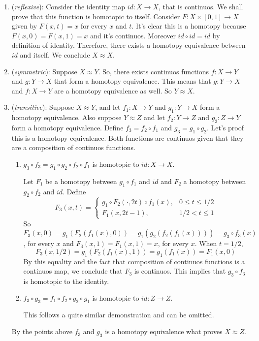 \documentclass[a4paper,11pt]{article}
\theoremstyle{mytheor}
\theoremstyle{mytheor}
\theoremstyle{remark}
\begin{document}
\begin{enumerate}
    \item (\textit{reflexive}): Consider the identity map $id: X \to X$,
    that is continuos.
    We shall prove that this function is homotopic to itself. Consider $F : X
    \times [0,1] \to X$ given by $F(x,t) = x$ for every $x$ and $t$. It's
    clear this is a homotopy because $F(x,0) = F(x,1) = x$ and it's continuos. Moreover
    $id \circ id = id$ by definition of identity. Therefore, there exists a
    homotopy equivalence between $id$ and itself. We conclude $X \approx X$.  

    \item (\textit{symmetric}): Suppose $X \approx Y$. So, there exists
    continuos functions $f: X \to Y$ and $g: Y \to X$ that form a homotopy
    equivalence. This means that $g: Y \to X$ and $f: X \to Y$ are a homotopy
    equivalence as well. So $Y \approx X$.

    \item (\textit{transitive}): Suppose $X \approx Y$, and let $f_1 : X \to
    Y$ and $g_1: Y \to X$
    form a homotopy equivalence. Also suppose $Y \approx Z$ and
    let $f_2: Y \to Z$ and $g_2: Z \to Y$ form a homotopy equivalence.
    Define $f_3 = f_2 \circ f_1$ and $g_3 = g_1 \circ g_2$. Let's proof this
    is a homotopy equivalence. Both functions are continuos given that they
    are a composition of continuos functions. 

    \begin{enumerate}
        \item $g_3 \circ f_3 = g_1 \circ g_2 \circ f_2 \circ f_1$ is homotopic
        to $id: X \to X$.

        Let $F_1$ be a homotopy between $g_1 \circ f_1$ and $id$ and $F_2$ a
        homotopy between $g_2 \circ f_2$ and $id$. Define 
        $$
        F_3(x,t) = \begin{cases}
            g_1 \circ F_2(\cdot,2t)\circ f_1(x), &0 \le t \le 1/2 \\
            F_1(x, 2t - 1), &1/2 < t \le 1
        \end{cases}
        $$
        So $F_3(x,0) = g_1(F_2(f_1(x),0)) = g_1(g_2(f_2(f_1(x)))) = g_3 \circ
        f_3(x)$, for every $x$ and 
        $F_3(x,1) = F_1(x,1) = x$, for every $x$. When $t = 1/2$, 
        $$F_3(x, 1/2) = g_1(F_2(f_1(x), 1)) = g_1(f_1(x)) = F_1(x,0)$$
        By this equality and the fact that composition of continuos
        functions is a continuos map, we conclude that $F_3$ is continuos.
        This implies that $g_3\circ f_3$ is homotopic to the identity.

        \item $f_3 \circ g_3 = f_1 \circ f_2 \circ g_2 \circ g_1$ is homotopic
        to $id: Z \to Z$.

       This follows a quite similar demonstration and can be omitted. 

    \end{enumerate}

    By the points above $f_3$ and $g_3$ is a homotopy equivalence what proves
    $X \approx Z$.    
\end{enumerate}
\end{document}
